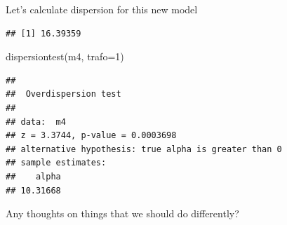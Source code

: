 \documentclass[
  ignorenonframetext,
]{beamer}
\newenvironment{Shaded}{\begin{snugshade}}{\end{snugshade}}
\newcommand{\AttributeTok}[1]{\textcolor[rgb]{0.77,0.63,0.00}{#1}}
\newcommand{\DecValTok}[1]{\textcolor[rgb]{0.00,0.00,0.81}{#1}}
\newcommand{\DocumentationTok}[1]{\textcolor[rgb]{0.56,0.35,0.01}{\textbf{\textit{#1}}}}
\newcommand{\FunctionTok}[1]{\textcolor[rgb]{0.00,0.00,0.00}{#1}}
\newcommand{\NormalTok}[1]{#1}
\newcommand{\OtherTok}[1]{\textcolor[rgb]{0.56,0.35,0.01}{#1}}
\newcommand{\SpecialCharTok}[1]{\textcolor[rgb]{0.00,0.00,0.00}{#1}}
\newcommand{\StringTok}[1]{\textcolor[rgb]{0.31,0.60,0.02}{#1}}
\begin{document}
\begin{frame}[fragile]{}
\protect\hypertarget{section-14}{}
Let's calculate dispersion for this new model

\vspace{12pt}
\tiny

\begin{Shaded}
\end{Shaded}

\begin{verbatim}
## [1] 16.39359
\end{verbatim}

\vspace{12pt}
\tiny

\begin{Shaded}
\begin{Highlighting}[]
\FunctionTok{dispersiontest}\NormalTok{(m4, }\AttributeTok{trafo=}\DecValTok{1}\NormalTok{)}
\end{Highlighting}
\end{Shaded}

\begin{verbatim}
## 
##  Overdispersion test
## 
## data:  m4
## z = 3.3744, p-value = 0.0003698
## alternative hypothesis: true alpha is greater than 0
## sample estimates:
##    alpha 
## 10.31668
\end{verbatim}

\vspace{12pt}
\normalsize

Any thoughts on things that we should do differently?
\end{frame}
\end{document}
